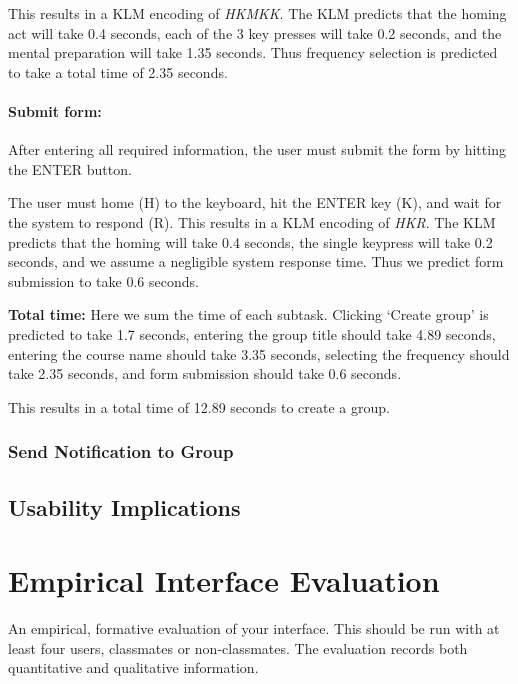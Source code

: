 \documentclass[conference]{IEEEtran}
\begin{document}
This results in a KLM encoding of \emph{HKMKK}.
The KLM predicts that the homing act will take 0.4 seconds, each of the 3 key presses will take 0.2 seconds, and the mental preparation will take 1.35 seconds.
Thus frequency selection is predicted to take a total time of 2.35 seconds.

\paragraph{Submit form:}
After entering all required information, the user must submit the form by hitting the ENTER button.

The user must home (H) to the keyboard, hit the ENTER key (K), and wait for the system to respond (R).
This results in a KLM encoding of \emph{HKR}.
The KLM predicts that the homing will take 0.4 seconds, the single keypress will take 0.2 seconds, and we assume a negligible system response time.
Thus we predict form submission to take 0.6 seconds.

\textbf{Total time:}
Here we sum the time of each subtask.
Clicking `Create group' is predicted to take 1.7 seconds,
entering the group title should take 4.89 seconds,
entering the course name should take 3.35 seconds,
selecting the frequency should take 2.35 seconds,
and form submission should take 0.6 seconds.

This results in a total time of 12.89 seconds to create a group.


\subsubsection{Send Notification to Group}


\subsection{Usability Implications}


\section{Empirical Interface Evaluation}
An empirical, formative evaluation of your interface. This should be run with at least four users, classmates or non-classmates. The evaluation records both quantitative and qualitative information. 
\end{document}
